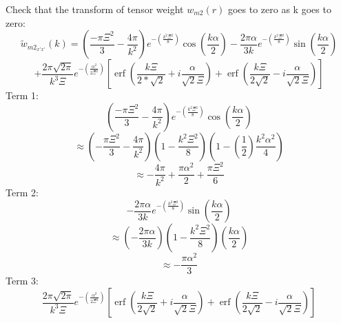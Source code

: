 \documentclass[double,12pt]{beavtex}
\begin{document}
\[{}\]
\noindent Check that the transform of tensor weight ${w}_{m2}(r)$ goes to zero as k goes to zero:
\begin{displaymath}{\widetilde{w}_{{m2}_{x'x'}}(k)=\left(\frac{-\pi\Xi^2}{3}-\frac{4\pi}{k^2}\right)e^{-\left(\frac{k^2\Xi^2}{8}\right)}\cos(\frac{k\alpha}{2})-\frac{2\pi\alpha}{3k}e^{-\left(\frac{k^2\Xi^2}{8}\right)}\sin(\frac{k\alpha}{2})}\end{displaymath} 
\begin{equation}{+\frac{2\pi\sqrt{2\pi}}{k^3\Xi}e^{-\left(\frac{\alpha^2}{2\Xi^2}\right)}\left[\operatorname{erf}\left(\frac{k\Xi}{2*\sqrt{2}}+i\frac{\alpha}{\sqrt{2}\Xi}\right)+\operatorname{erf}\left(\frac{k\Xi}{2\sqrt{2}}-i\frac{\alpha}{\sqrt{2}\Xi}\right)\right]}\end{equation}
\[{}\]
Term 1: 
\begin{equation}{\left(\frac{-\pi\Xi^2}{3}-\frac{4\pi}{k^2}\right)e^{-\left(\frac{k^2\Xi^2}{8}\right)}\cos(\frac{k\alpha}{2})}\end{equation}
\begin{displaymath}{\approx\left(-\frac{\pi\Xi^2}{3}-\frac{4\pi}{k^2}\right)\left(1-\frac{k^2\Xi^2}{8}\right)\left(1-\left(\frac{1}{2}\right)\frac{k^2\alpha^2}{4}\right)}\end{displaymath} 
\begin{displaymath}{\approx-\frac{4\pi}{k^2}+\frac{\pi\alpha^2}{2}+\frac{\pi\Xi^2}{6}}\end{displaymath} 
\color{black}
Term 2:
\begin{equation}{-\frac{2\pi\alpha}{3k}e^{-\left(\frac{k^2\Xi^2}{8}\right)}\sin(\frac{k\alpha}{2})}\end{equation} 
\begin{displaymath}{\approx\left(-\frac{2\pi\alpha}{3k}\right)\left(1-\frac{k^2\Xi^2}{8}\right)\left(\frac{k\alpha}{2}\right)}\end{displaymath} 
\begin{displaymath}{\approx}-\frac{\pi\alpha^2}{3}\end{displaymath}
\color{black} 
Term 3:
\begin{equation}{\frac{2\pi\sqrt{2\pi}}{k^3\Xi}e^{-\left(\frac{\alpha^2}{2\Xi^2}\right)}\left[\operatorname{erf}\left(\frac{k\Xi}{2\sqrt{2}}+i\frac{\alpha}{\sqrt{2}\Xi}\right)+\operatorname{erf}\left(\frac{k\Xi}{2\sqrt{2}}-i\frac{\alpha}{\sqrt{2}\Xi}\right)\right]}\end{equation}
\end{document}

